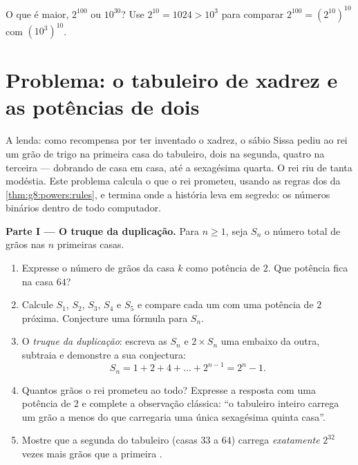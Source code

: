 \begin{exercise}[$\star\star\star$]\label{exo:g8:powers:11}
O que é maior, $2^{100}$ ou $10^{30}$? Use $2^{10} = 1024 > 10^3$ para
comparar $2^{100} = \left(2^{10}\right)^{10}$ com
$\left(10^3\right)^{10}$.
\end{exercise}

\section{Problema: o tabuleiro de xadrez e as potências de dois}

\begin{problem}[{Problema de fim de semana --- a \omterm{def:g1:addition:def}{soma} geométrica
$1 + 2 + 4 + \dots + 2^{n-1} = 2^n - 1$, de uma lenda famosa aos
números binários}]
\label{pb:g8:powers:1}
A lenda: como recompensa por ter inventado o xadrez, o sábio Sissa
pediu ao rei um grão de trigo na primeira casa do tabuleiro, dois na
segunda, quatro na terceira --- dobrando de casa em casa, até a
sexagésima quarta. O rei riu de tanta modéstia. Este problema calcula o
que o rei prometeu, usando as regras dos  da
\cref{thm:g8:powers:rules}, e termina onde a história leva em segredo:
os números binários dentro de todo computador.

\medskip
\noindent\textbf{Parte I --- O truque da duplicação.}
Para $n \geq 1$, seja $S_n$ o número total de grãos nas $n$ primeiras
casas.
\begin{enumerate}
  \item Expresse o número de grãos da casa $k$ como potência de $2$.
        Que potência fica na casa $64$?
  \item Calcule $S_1$, $S_2$, $S_3$, $S_4$ e $S_5$ e compare cada um
        com uma potência de $2$ próxima. Conjecture uma fórmula para
        $S_n$.
  \item O \emph{truque da duplicação}: escreva as  $S_n$ e
        $2 \times S_n$ uma embaixo da outra, subtraia e demonstre a sua
        conjectura:
        \[
        S_n = 1 + 2 + 4 + \dots + 2^{n-1} = 2^n - 1 .
        \]
  \item Quantos grãos o rei prometeu ao todo? Expresse a resposta com
        uma potência de $2$ e complete a observação clássica: ``o
        tabuleiro inteiro carrega um grão a menos do que carregaria uma
        única sexagésima quinta casa''.
  \item Mostre que a segunda  do tabuleiro (casas $33$ a $64$)
        carrega \emph{exatamente} $2^{32}$ vezes mais grãos que a
        primeira .
\end{enumerate}


\end{problem}
